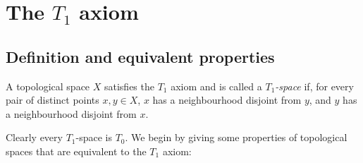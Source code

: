 \documentclass[article, a4paper, 11pt, oneside]{memoir}
\numberwithin{equation}{chapter}
\begin{document}






\chapter[The T1 axiom][The $T_1$ axiom]{The $T_1$ axiom}

\section{Definition and equivalent properties}

\begin{definition}
    A topological space $X$ satisfies the $T_1$ axiom and is called a \emph{$T_1$-space} if, for every pair of distinct points $x,y \in X$, $x$ has a neighbourhood disjoint from $y$, and $y$ has a neighbourhood disjoint from $x$.
\end{definition}
%
Clearly every $T_1$-space is $T_0$. We begin by giving some properties of topological spaces that are equivalent to the $T_1$ axiom:
\end{document}
